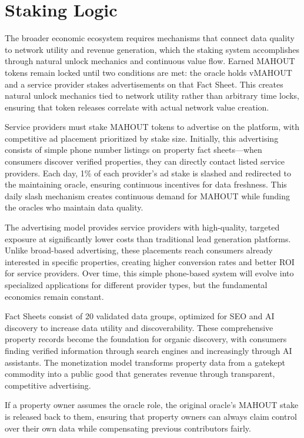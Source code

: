 \section{Staking Logic}

The broader economic ecosystem requires mechanisms that connect data quality to network utility and revenue generation, which the staking system accomplishes through natural unlock mechanics and continuous value flow. Earned MAHOUT tokens remain locked until two conditions are met: the oracle holds vMAHOUT and a service provider stakes advertisements on that Fact Sheet. This creates natural unlock mechanics tied to network utility rather than arbitrary time locks, ensuring that token releases correlate with actual network value creation.

Service providers must stake MAHOUT tokens to advertise on the platform, with competitive ad placement prioritized by stake size. Initially, this advertising consists of simple phone number listings on property fact sheets---when consumers discover verified properties, they can directly contact listed service providers. Each day, 1\% of each provider's ad stake is slashed and redirected to the maintaining oracle, ensuring continuous incentives for data freshness. This daily slash mechanism creates continuous demand for MAHOUT while funding the oracles who maintain data quality.

The advertising model provides service providers with high-quality, targeted exposure at significantly lower costs than traditional lead generation platforms. Unlike broad-based advertising, these placements reach consumers already interested in specific properties, creating higher conversion rates and better ROI for service providers. Over time, this simple phone-based system will evolve into specialized applications for different provider types, but the fundamental economics remain constant.

Fact Sheets consist of 20 validated data groups, optimized for SEO and AI discovery to increase data utility and discoverability. These comprehensive property records become the foundation for organic discovery, with consumers finding verified information through search engines and increasingly through AI assistants. The monetization model transforms property data from a gatekept commodity into a public good that generates revenue through transparent, competitive advertising.

If a property owner assumes the oracle role, the original oracle's MAHOUT stake is released back to them, ensuring that property owners can always claim control over their own data while compensating previous contributors fairly.

